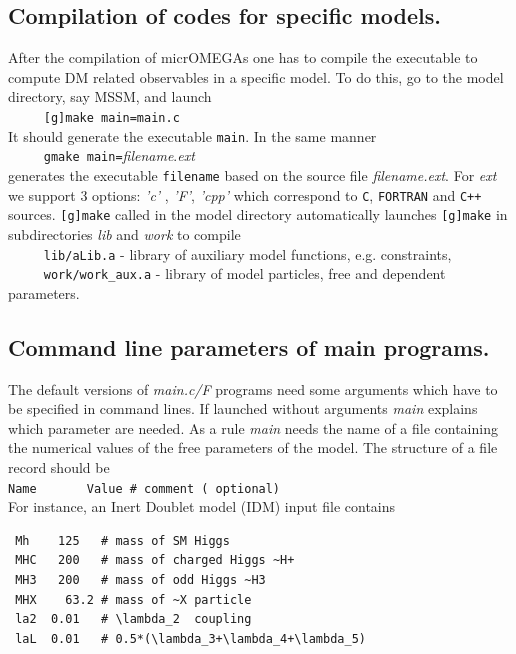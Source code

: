 \documentclass[12pt,a4paper]{article}
\begin{document}
\subsection{Compilation of codes for specific models.}
 After the compilation of micrOMEGAs one has to compile
the executable to compute DM related observables in a specific model. To
do this, go to the model directory, say MSSM,  and launch\\
\verb|     [g]make main=main.c|\\
It should generate the executable {\tt main}. In the same manner\\
\verb|     gmake main=|{\it filename}.{\it ext}\\ 
generates the executable {\tt filename}  based on the source file {\it
filename.ext}.
For {\it ext}  we support 3 options: {\it 'c'} , {\it 'F'}, {\it 'cpp'} which correspond to
{\tt C}, {\tt FORTRAN} and {\tt C++} sources.
{\tt [g]make} called  in the model directory automatically  launches {\tt [g]make}
in subdirectories {\it lib} and {\it work} to compile \\
 \verb|     lib/aLib.a|   - library of auxiliary model functions, e.g. constraints,\\
 \verb|     work/work_aux.a| - library of model particles, free and dependent parameters.\\

\subsection{Command line parameters of main programs.}
\label{sec:command}
The default versions of {\it main.c/F}  programs need some arguments
which have to be specified in command lines. If launched without
arguments {\it main} explains which parameter are needed. 
As a rule  {\it main}  needs  the name of a file containing the
numerical values of the free parameters of the model. The structure of a file
record should be\\
\verb|Name       Value # comment ( optional)|\\
For instance, an Inert Doublet model (IDM) input file contains
\begin{verbatim}
 Mh    125   # mass of SM Higgs 
 MHC   200   # mass of charged Higgs ~H+
 MH3   200   # mass of odd Higgs ~H3
 MHX    63.2 # mass of ~X particle
 la2  0.01   # \lambda_2  coupling
 laL  0.01   # 0.5*(\lambda_3+\lambda_4+\lambda_5)
\end{verbatim}
\end{document}
